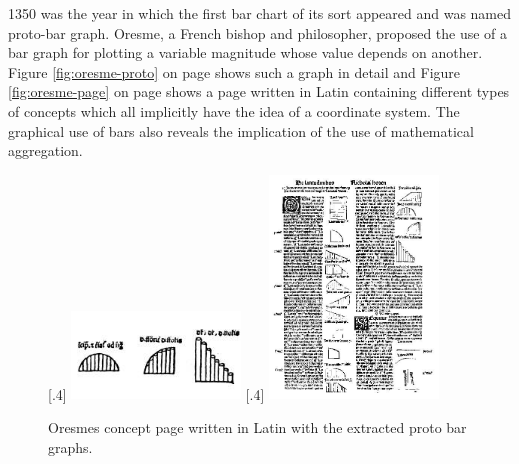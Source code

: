 1350 was the year in which the first bar chart of its sort appeared and was named proto-bar graph. Oresme, a French bishop and philosopher, proposed the use of a bar graph for plotting a variable magnitude whose value depends on another. Figure \ref{fig:oresme-proto} on page \pageref{fig:oresme-proto} shows such a graph in detail and Figure \ref{fig:oresme-page} on page \pageref{fig:oresme-page} shows a page written in Latin containing different types of concepts which all implicitly have the idea of a coordinate system. The graphical use of bars also reveals the implication of the use of mathematical aggregation.

\begin{figure}[!htb]
    \centering
  [.4\linewidth]
    {
        \includegraphics[width=0.4\textwidth,keepaspectratio]
        {images/history/oresme-proto.jpg}
    }
    \qquad
    [.4\linewidth]
    {
        \includegraphics[width=0.4\textwidth,keepaspectratio]
        {images/history/oresme-page.jpg}
    }

    \caption{Oresmes concept page written in Latin with the extracted proto bar graphs.}
\end{figure}

